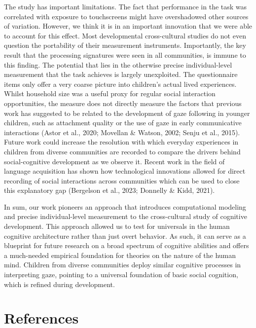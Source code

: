 \documentclass[
  man,floatsintext]{apa7}
\begin{document}
The study has important limitations. The fact that performance in the task was correlated with exposure to touchscreens might have overshadowed other sources of variation. However, we think it is in an important innovation that we were able to account for this effect. Most developmental cross-cultural studies do not even question the portability of their measurement instruments. Importantly, the key result that the processing signatures were seen in all communities, is immune to this finding. The potential that lies in the otherwise precise individual-level measurement that the task achieves is largely unexploited. The questionnaire items only offer a very coarse picture into children's actual lived experiences. Whilst household size was a useful proxy for regular social interaction opportunities, the measure does not directly measure the factors that previous work has suggested to be related to the development of gaze following in younger children, such as attachment quality or the use of gaze in early communicative interactions (Astor et al., 2020; Movellan \& Watson, 2002; Senju et al., 2015). Future work could increase the resolution with which everyday experiences in children from diverse communities are recorded to compare the drivers behind social-cognitive development as we observe it. Recent work in the field of language acquisition has shown how technological innovations allowed for direct recording of social interactions across communities which can be used to close this explanatory gap (Bergelson et al., 2023; Donnelly \& Kidd, 2021).

In sum, our work pioneers an approach that introduces computational modeling and precise individual-level measurement to the cross-cultural study of cognitive development. This approach allowed us to test for universals in the human cognitive architecture rather than just overt behavior. As such, it can serve as a blueprint for future research on a broad spectrum of cognitive abilities and offers a much-needed empirical foundation for theories on the nature of the human mind. Children from diverse communities deploy similar cognitive processes in interpreting gaze, pointing to a universal foundation of basic social cognition, which is refined during development.

\newpage

\hypertarget{references}{%
\section{References}\label{references}}
\end{document}
